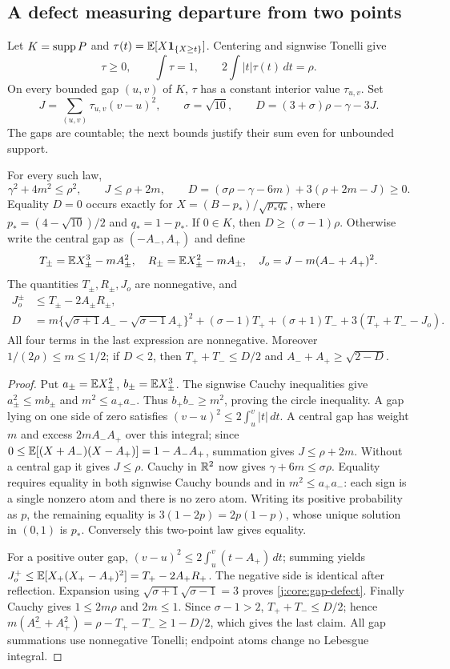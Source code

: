 \subsection{A defect measuring departure from two points}
Let $K=\operatorname{supp} P$ and $\tau(t)=\mathbb E[X\mathbf1_{\{X\ge t\}}]$.
Centering and signwise Tonelli give
\[
 \tau\ge0,\qquad \int\tau=1,\qquad 2\int|t|\tau(t)\,dt=\rho.
\]
On every bounded gap $(u,v)$ of $K$, $\tau$ has a constant interior value
$\tau_{u,v}$. Set
\begin{equation}\label{j:core:defect-definition}
 J=\sum_{(u,v)}\tau_{u,v}(v-u)^2,\qquad
 \sigma=\sqrt{10},\qquad D=(3+\sigma)\rho-\gamma-3J.
\end{equation}
The gaps are countable; the next bounds justify their sum even for
unbounded support.
\begin{theorem}\label{j:core:defect}
For every such law,
\[
 \gamma^2+4m^2\le\rho^2,\qquad J\le\rho+2m,\qquad
 D=(\sigma\rho-\gamma-6m)+3(\rho+2m-J)\ge0.
\]
Equality $D=0$ occurs exactly for
$X=(B-p_*)/\sqrt{p_*q_*}$, where
$p_*=(4-\sqrt{10})/2$ and $q_*=1-p_*$.
If $0\in K$, then $D\ge(\sigma-1)\rho$. Otherwise write the central
gap as $(-A_-,A_+)$ and define
\[
 T_\pm=\mathbb E X_\pm^3-mA_\pm^2,\quad
 R_\pm=\mathbb E X_\pm^2-mA_\pm,\quad J_o=J-m(A_-+A_+)^2.
\]
The quantities $T_\pm,R_\pm,J_o$ are nonnegative, and
\begin{align}
 J_o^\pm&\le T_\pm-2A_\pm R_\pm,\label{j:core:outer-gaps}\\
 D&=m\{\sqrt{\sigma+1}A_--\sqrt{\sigma-1}A_+\}^2
 +(\sigma-1)T_++(\sigma+1)T_-+3(T_++T_--J_o).\label{j:core:gap-defect}
\end{align}
All four terms in the last expression are nonnegative.
Moreover $1/(2\rho)\le m\le1/2$; if $D<2$, then
$T_++T_-\le D/2$ and $A_-+A_+\ge\sqrt{2-D}$.
\end{theorem}
\begin{proof}
Put $a_\pm=\mathbb E X_\pm^2$, $b_\pm=\mathbb E X_\pm^3$.
The signwise Cauchy inequalities give $a_\pm^2\le mb_\pm$ and
$m^2\le a_+a_-$. Thus $b_+b_-\ge m^2$, proving the circle inequality.
A gap lying on one side of zero satisfies
$(v-u)^2\le2\int_u^v|t|\,dt$. A central gap has weight $m$ and excess
$2mA_-A_+$ over this integral; since
$0\le\mathbb E[(X+A_-)(X-A_+)]=1-A_-A_+$, summation gives $J\le\rho+2m$.
Without a central gap it gives $J\le\rho$. Cauchy in $\mathbb R^2$ now gives
$\gamma+6m\le\sigma\rho$. Equality requires equality in both signwise
Cauchy bounds and in $m^2\le a_+a_-$: each sign is a single nonzero
atom and there is no zero atom. Writing its positive probability as $p$,
the remaining equality is $3(1-2p)=2p(1-p)$, whose unique solution
in $(0,1)$ is $p_*$. Conversely this two-point law gives equality.

For a positive outer gap,
$(v-u)^2\le2\int_u^v(t-A_+)\,dt$; summing yields
$J_o^+\le\mathbb E[X_+(X_+-A_+)^2]=T_+-2A_+R_+$.
The negative side is identical after reflection. Expansion using
$\sqrt{\sigma+1}\sqrt{\sigma-1}=3$ proves \eqref{j:core:gap-defect}.
Finally Cauchy gives $1\le2m\rho$ and $2m\le1$.
Since $\sigma-1>2$, $T_++T_-\le D/2$; hence
$m(A_-^2+A_+^2)=\rho-T_+-T_-\ge1-D/2$, which gives the last claim.
All gap summations use nonnegative Tonelli; endpoint atoms change no
Lebesgue integral.
\end{proof}
